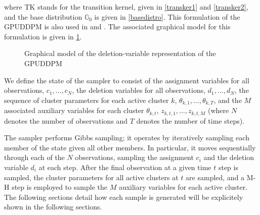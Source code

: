 \documentclass[smallcondensed, final]{svjour3}
\begin{document}
where TK stands for the transition kernel, given in \eqref{transker1} and \eqref{transker2}, and the base distribution $\mathbb{G}_{0}$ is given in \eqref{basedistro}. This formulation of the GPUDDPM is also used in \cite{gasthaus_thesis} and \cite{caron_2007}. The associated graphical model for this formulation is given in \ref{fig:gpuddpm_gm_2}.
\begin{figure}[h]
        \caption{\label{fig:gpuddpm_gm_2} Graphical model of the deletion-variable representation of the GPUDDPM}
\end{figure}


We define the state of the sampler to consist of the assignment variables for all observations, $c_{1}, \ldots, c_{N}$, the deletion variables for all observations, $d_{1}, \dots, d_{N}$, the sequence of cluster parameters for each active cluster $k$, $\theta_{k,1}, \ldots, \theta_{k, T}$, and the $M$ associated auxiliary variables for each cluster $\theta_{k,t}$, $z_{k,t,1}, \ldots, z_{k, t, M}$ (where $N$ denotes the number of observations and $T$ denotes the number of time steps).

The sampler performs Gibbs sampling; it operates by iteratively sampling each member of the state given all other members. In particular, it moves sequentially through each of the $N$ observations, sampling the assignment $c_{i}$ and the deletion variable $d_{i}$ at each step. After the final observation at a given time $t$ step is sampled, the cluster parameters for all active clusters at $t$ are sampled, and a M-H step is employed to sample the $M$ auxiliary variables for each active cluster. The following sections detail how each sample is generated will be explicitely shown in the following sections.
\end{document}
